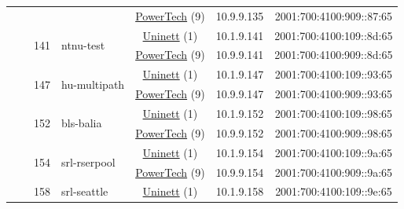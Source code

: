 \begin{small}
\begin{center}
\begin{longtable}{|c|c|c|c|c|c|c|c|}
  &  &  &  & \multicolumn{2}{|c|}{\tiny{\href{http://www.powertech.no}{PowerTech} (9)}} & \tiny{10.9.9.135} & \tiny{2001:700:4100:909::87:65} \\* \cline{3-3}\cline{4-4}\cline{5-5}\cline{6-6}\cline{7-7}\cline{8-8}
  &  & \multirow{2}{*}{\tiny{141}} & \multicolumn{1}{|l|}{\multirow{2}{*}{\tiny{ntnu-test}}} & \multicolumn{2}{|c|}{\tiny{\href{https://www.uninett.no}{Uninett} (1)}} & \tiny{10.1.9.141} & \tiny{2001:700:4100:109::8d:65} \\* \cline{5-5}\cline{6-6}\cline{7-7}\cline{8-8}
  &  &  &  & \multicolumn{2}{|c|}{\tiny{\href{http://www.powertech.no}{PowerTech} (9)}} & \tiny{10.9.9.141} & \tiny{2001:700:4100:909::8d:65} \\* \cline{3-3}\cline{4-4}\cline{5-5}\cline{6-6}\cline{7-7}\cline{8-8}
  &  & \multirow{2}{*}{\tiny{147}} & \multicolumn{1}{|l|}{\multirow{2}{*}{\tiny{hu-multipath}}} & \multicolumn{2}{|c|}{\tiny{\href{https://www.uninett.no}{Uninett} (1)}} & \tiny{10.1.9.147} & \tiny{2001:700:4100:109::93:65} \\* \cline{5-5}\cline{6-6}\cline{7-7}\cline{8-8}
  &  &  &  & \multicolumn{2}{|c|}{\tiny{\href{http://www.powertech.no}{PowerTech} (9)}} & \tiny{10.9.9.147} & \tiny{2001:700:4100:909::93:65} \\* \cline{3-3}\cline{4-4}\cline{5-5}\cline{6-6}\cline{7-7}\cline{8-8}
  &  & \multirow{2}{*}{\tiny{152}} & \multicolumn{1}{|l|}{\multirow{2}{*}{\tiny{bls-balia}}} & \multicolumn{2}{|c|}{\tiny{\href{https://www.uninett.no}{Uninett} (1)}} & \tiny{10.1.9.152} & \tiny{2001:700:4100:109::98:65} \\* \cline{5-5}\cline{6-6}\cline{7-7}\cline{8-8}
  &  &  &  & \multicolumn{2}{|c|}{\tiny{\href{http://www.powertech.no}{PowerTech} (9)}} & \tiny{10.9.9.152} & \tiny{2001:700:4100:909::98:65} \\* \cline{3-3}\cline{4-4}\cline{5-5}\cline{6-6}\cline{7-7}\cline{8-8}
  &  & \multirow{2}{*}{\tiny{154}} & \multicolumn{1}{|l|}{\multirow{2}{*}{\tiny{srl-rserpool}}} & \multicolumn{2}{|c|}{\tiny{\href{https://www.uninett.no}{Uninett} (1)}} & \tiny{10.1.9.154} & \tiny{2001:700:4100:109::9a:65} \\* \cline{5-5}\cline{6-6}\cline{7-7}\cline{8-8}
  &  &  &  & \multicolumn{2}{|c|}{\tiny{\href{http://www.powertech.no}{PowerTech} (9)}} & \tiny{10.9.9.154} & \tiny{2001:700:4100:909::9a:65} \\* \cline{3-3}\cline{4-4}\cline{5-5}\cline{6-6}\cline{7-7}\cline{8-8}
  &  & \multirow{2}{*}{\tiny{158}} & \multicolumn{1}{|l|}{\multirow{2}{*}{\tiny{srl-seattle}}} & \multicolumn{2}{|c|}{\tiny{\href{https://www.uninett.no}{Uninett} (1)}} & \tiny{10.1.9.158} & \tiny{2001:700:4100:109::9e:65} \\* \cline{5-5}\cline{6-6}\cline{7-7}\cline{8-8}

\end{longtable}
\end{center}
\end{small}
